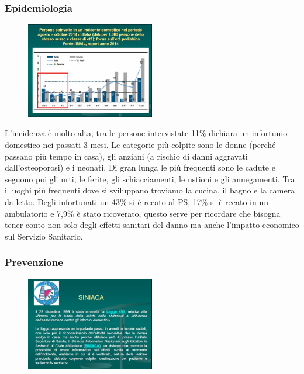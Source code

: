 \subsubsection{Epidemiologia}

\begin{figure}[!ht]
\centering
	\includegraphics[width=0.5\textwidth]{28/image6.jpg}
	\end{figure}

L'incidenza è molto alta, tra le persone intervistate 11\% dichiara un
infortunio domestico nei passati 3 mesi. Le categorie più colpite sono
le donne (perché passano più tempo in casa), gli anziani (a rischio di
danni aggravati dall'osteoporosi) e i neonati. Di gran lunga le più
frequenti sono le cadute e seguono poi gli urti, le ferite, gli
schiacciamenti, le ustioni e gli annegamenti. Tra i luoghi più frequenti
dove si sviluppano troviamo la cucina, il bagno e la camera da letto.
Degli infortunati un 43\% si è recato al PS, 17\% si è recato in un
ambulatorio e 7,9\% è stato ricoverato, questo serve per ricordare che
bisogna tener conto non solo degli effetti sanitari del danno ma anche
l'impatto economico sul Servizio Sanitario.

\subsubsection{Prevenzione}

\begin{figure}[!ht]
\centering
	\includegraphics[width=0.5\textwidth]{28/image7.jpg}
	\end{figure}
	
